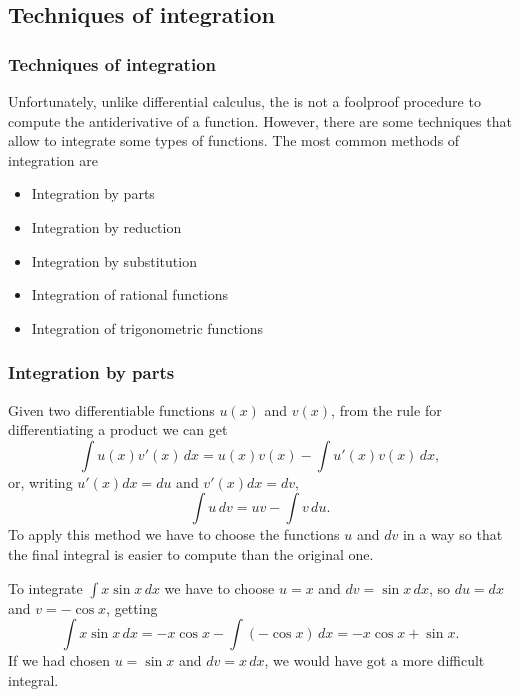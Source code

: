 \subsection{Techniques of integration}
\begin{frame}
\frametitle{Techniques of integration}
Unfortunately, unlike differential calculus, the is not a foolproof procedure to compute the antiderivative of a function.
However, there are some techniques that allow to integrate some types of functions. 
The most common methods of integration are
\begin{itemize}
\item Integration by parts
\item Integration by reduction
\item Integration by substitution
\item Integration of rational functions
\item Integration of trigonometric functions
\end{itemize}
\end{frame}


\begin{frame}
\frametitle{Integration by parts}
Given two differentiable functions $u(x)$ and $v(x)$, from the rule for differentiating a product we can get
\[
\int{u(x)v'(x)}\,dx=u(x)v(x)-\int{u'(x)v(x)}\,dx,
\]
or, writing $u'(x)dx=du$ and $v'(x)dx=dv$,
\[
\int{u}\,dv=uv-\int{v}\,du.
\]
To apply this method we have to choose the functions $u$ and $dv$ in a way so that the final integral is easier to compute than the original one. 

 To integrate $\int{x \sin x}\,dx$ we have to choose $u=x$ and $dv=\sin x\, dx$, so $du=dx$ and $v=-\cos x$, getting
\[
\int{x \sin x}\,dx=-x\cos x-\int (-\cos x)\,dx = -x\cos x +\sin x.
\]
If we had chosen $u=\sin x$ and $dv=x\,dx$, we would have got a more difficult integral. 
\end{frame}



